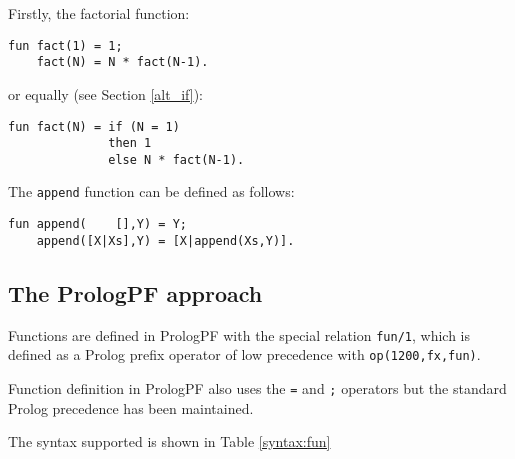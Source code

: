 Firstly, the factorial function:
\begin{verbatim}
fun fact(1) = 1;
    fact(N) = N * fact(N-1).
\end{verbatim}
or equally (see Section \ref{alt_if}):
\begin{verbatim}
fun fact(N) = if (N = 1)
              then 1
              else N * fact(N-1).
\end{verbatim}
The \texttt{append} function can be defined as follows:
\begin{verbatim}
fun append(    [],Y) = Y;
    append([X|Xs],Y) = [X|append(Xs,Y)].
\end{verbatim}

\subsection{The PrologPF approach}

Functions are defined in PrologPF with the special relation
\texttt{fun/1}, which is defined as a Prolog
prefix operator of low precedence with \texttt{op(1200,fx,fun)}.

Function definition in PrologPF also uses the \texttt{=} and \texttt{;}
operators but the standard Prolog precedence has been maintained.

The syntax supported is shown in Table \ref{syntax:fun}

